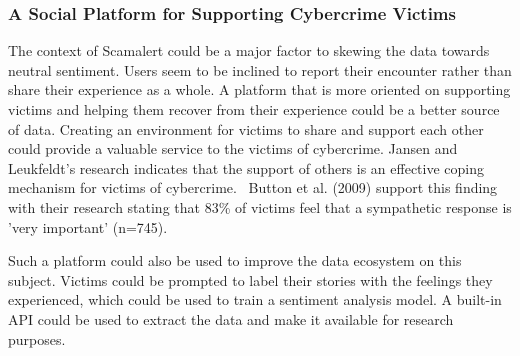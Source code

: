 \subsubsection*{A Social Platform for Supporting Cybercrime Victims}

The context of Scamalert could be a major factor to skewing the data towards neutral sentiment. Users seem to be inclined to report their encounter rather than share their experience as a whole. A platform that is more oriented on supporting victims and helping them recover from their experience could be a better source of data. Creating an environment for victims to share and support each other could provide a valuable service to the victims of cybercrime. Jansen and Leukfeldt's research indicates that the support of others is an effective coping mechanism for victims of cybercrime.~\cite{jansen2018coping} Button et al. (2009) support this finding with their research stating that 83\% of victims feel that a sympathetic response is 'very important' (n=745).

Such a platform could also be used to improve the data ecosystem on this subject. Victims could be prompted to label their stories with the feelings they experienced, which could be used to train a sentiment analysis model. A built-in API could be used to extract the data and make it available for research purposes.